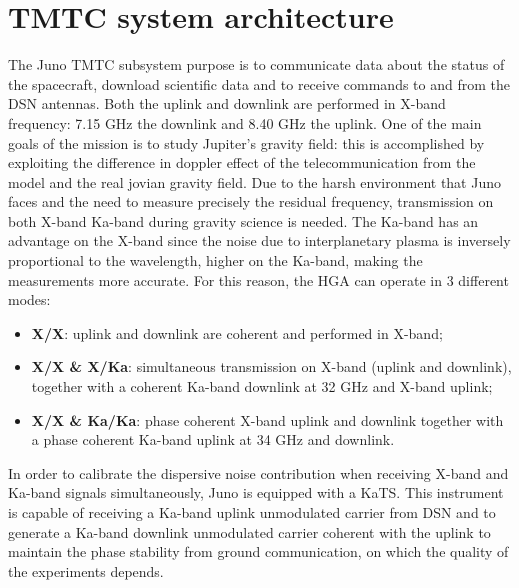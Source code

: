 \section{TMTC system architecture}
\label{sec:TMTC_architecture}



The Juno TMTC subsystem purpose is to communicate data about the status of the spacecraft, download scientific data and to receive commands to and from the DSN antennas. Both the uplink and downlink are performed in X-band frequency: 7.15 GHz the downlink and 8.40 GHz the uplink. One of the main goals of the mission is to study Jupiter's gravity field: this is accomplished by exploiting the difference in doppler effect of the telecommunication from the model and the real jovian gravity field. Due to the harsh environment that Juno faces and the need to measure precisely the residual frequency, transmission on both X-band Ka-band during gravity science is needed. The Ka-band has an advantage on the X-band since the noise due to interplanetary plasma is inversely proportional to the wavelength, higher on the Ka-band, making the measurements more accurate. 
For this reason, the HGA can operate in 3 different modes: 

\begin{itemize}
\item \textbf{X/X}: uplink and downlink are coherent and performed in X-band;
\item \textbf{X/X \& X/Ka}: simultaneous transmission on X-band (uplink and downlink), together with a coherent Ka-band downlink at 32 GHz and X-band uplink;
\item \textbf{X/X \& Ka/Ka}: phase coherent X-band uplink and downlink together with a phase coherent Ka-band uplink at 34 GHz and downlink.
\end{itemize}

In order to calibrate the dispersive noise contribution when receiving X-band and Ka-band signals simultaneously, Juno is equipped with a KaTS. This instrument is capable of receiving a Ka-band uplink unmodulated carrier from DSN and to generate a Ka-band downlink unmodulated carrier coherent with the uplink to maintain the phase stability from ground communication, on which the quality of the experiments depends\cite{juno_telecommunication}.

